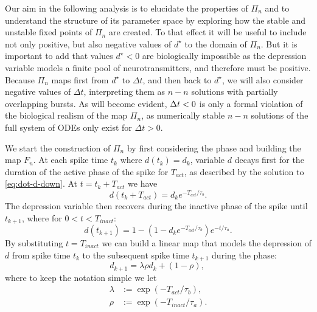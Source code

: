 Our aim in the following analysis is to elucidate the properties of $\Pi_n$ and to understand the structure of its parameter space by exploring how the stable and unstable fixed points of $\Pi_{n}$ are created.
To that effect it will be useful to include not only positive, but also negative values of $d^{\star}$ to the domain of $\Pi_{n}$.
But it is important to add that values $d^{\star}<0$ are biologically impossible as the depression variable models a finite pool of neurotransmitters, and therefore must be positive.
Because $\Pi_{n}$ maps first from $d^{\star}$ to $\Delta t$, and then back to $d^{\star}$, we will also consider negative values of $\Delta t$, interpreting them as $n-n$ solutions with partially overlapping bursts.
As will become evident, $\Delta t<0$ is only a formal violation of the biological realism of the map $\Pi_{n}$, as numerically stable $n-n$ solutions of the full system of ODEs only exist for $\Delta t>0$.

We start the construction of $\Pi_n$ by first considering the \free{} phase and building the map $F_n$.
At each spike time $t_{k}$ where $d(t_k) = d_k$, variable $d$ decays first for the duration of the active phase of the spike for $T_{act}$, as described by the solution to \cref{eq:dot-d-down}.
At $t = t_k + T_{act}$ we have
\begin{equation}
	d(t_k + T_{act}) = d_k e^{-T_{act}/\tau_b}.
\end{equation}
The depression variable then recovers during the inactive phase of the spike until $t_{k+1}$, where for $0<t<T_{inact}$:
\begin{equation}
	d(t_{k+1}) = 1 - (1 - d_k e^{-T_{act}/\tau_b} )e^{-t/\tau_a}.
\end{equation}
By substituting $t=T_{inact}$ we can build a linear map that models the depression of $d$ from spike time $t_{k}$ to the subsequent spike time $t_{k+1}$ during the \free{} phase:
\begin{equation}
	d_{k+1} = \lambda\rho d_{k} + (1-\rho),~\label{eq:map-d}
\end{equation}
where to keep the notation simple we let
\begin{align}
	\lambda & := \exp(-T_{act}/\tau_b), \label{eq:lambda} \\
	\rho    & :=\exp(-T_{inact}/\tau_{a}). \label{eq:rho}
\end{align}

